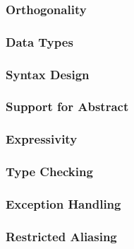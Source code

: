 \message{ !name(final-project.tex)}\documentclass{article}
\begin{document}
  \subsubsection{Orthogonality}

  \subsubsection{Data Types}

  \subsubsection{Syntax Design}

  \subsubsection{Support for Abstract}

  \subsubsection{Expressivity}

  \subsubsection{Type Checking}

  \subsubsection{Exception Handling}

  \subsubsection{Restricted Aliasing}

  \newpage
  \nocite{*} \printbibliography[heading=bibintoc,title={References}]{}
\end{document}
